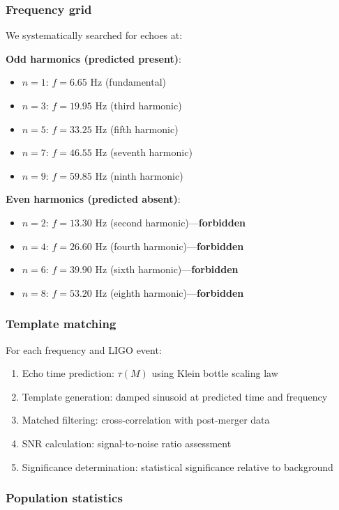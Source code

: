 \documentclass[12pt]{iopart}
\begin{document}
\subsubsection{Frequency grid}

We systematically searched for echoes at:

\textbf{Odd harmonics (predicted present)}:
\begin{itemize}
\item $n=1$: $f = 6.65$ Hz (fundamental)
\item $n=3$: $f = 19.95$ Hz (third harmonic)
\item $n=5$: $f = 33.25$ Hz (fifth harmonic)
\item $n=7$: $f = 46.55$ Hz (seventh harmonic)
\item $n=9$: $f = 59.85$ Hz (ninth harmonic)
\end{itemize}

\textbf{Even harmonics (predicted absent)}:
\begin{itemize}
\item $n=2$: $f = 13.30$ Hz (second harmonic)---\textbf{forbidden}
\item $n=4$: $f = 26.60$ Hz (fourth harmonic)---\textbf{forbidden}
\item $n=6$: $f = 39.90$ Hz (sixth harmonic)---\textbf{forbidden}
\item $n=8$: $f = 53.20$ Hz (eighth harmonic)---\textbf{forbidden}
\end{itemize}

\subsubsection{Template matching}

For each frequency and LIGO event:
\begin{enumerate}
\item Echo time prediction: $\tau(M)$ using Klein bottle scaling law
\item Template generation: damped sinusoid at predicted time and frequency
\item Matched filtering: cross-correlation with post-merger data
\item SNR calculation: signal-to-noise ratio assessment
\item Significance determination: statistical significance relative to background
\end{enumerate}

\subsubsection{Population statistics}
\end{document}
